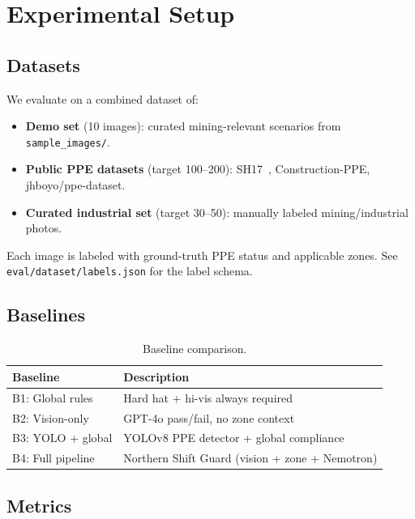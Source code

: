 \section{Experimental Setup}
\label{sec:experiments}

\subsection{Datasets}

We evaluate on a combined dataset of:
\begin{itemize}
  \item \textbf{Demo set} (10 images): curated mining-relevant scenarios from \texttt{sample\_images/}.
  \item \textbf{Public PPE datasets} (target 100--200): SH17~\cite{sh17}, Construction-PPE, jhboyo/ppe-dataset.
  \item \textbf{Curated industrial set} (target 30--50): manually labeled mining/industrial photos.
\end{itemize}

Each image is labeled with ground-truth PPE status and applicable zones. See \texttt{eval/dataset/labels.json} for the label schema.

\subsection{Baselines}

\begin{table}[htbp]
  \centering
  \caption{Baseline comparison.}
  \label{tab:baselines}
  \begin{tabular}{@{}ll@{}}
    \toprule
    Baseline & Description \\
    \midrule
    B1: Global rules & Hard hat + hi-vis always required \\
    B2: Vision-only & GPT-4o pass/fail, no zone context \\
    B3: YOLO + global & YOLOv8 PPE detector + global compliance \\
    B4: Full pipeline & Northern Shift Guard (vision + zone + Nemotron) \\
    \bottomrule
  \end{tabular}
\end{table}

\subsection{Metrics}


